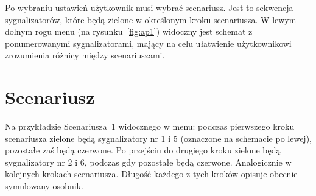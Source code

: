 Po wybraniu ustawień użytkownik musi wybrać scenariusz. Jest to sekwencja sygnalizatorów, które będą zielone w określonym kroku scenariusza. W lewym dolnym rogu menu (na rysunku~\ref{fig:ap1}) widoczny jest schemat z ponumerowanymi sygnalizatorami, mający na celu ułatwienie użytkownikowi zrozumienia różnicy między scenariuszami. 
\section*{Scenariusz} Na przykładzie Scenariusza~1 widocznego w menu: podczas pierwszego kroku scenariusza zielone będą sygnalizatory nr 1 i 5 (oznaczone na schemacie po lewej), pozostałe zaś będą czerwone. Po przejściu do drugiego kroku zielone będą sygnalizatory nr 2 i 6, podczas gdy pozostałe będą czerwone. Analogicznie w kolejnych krokach scenariusza. Długość każdego z tych kroków opisuje obecnie symulowany osobnik.
